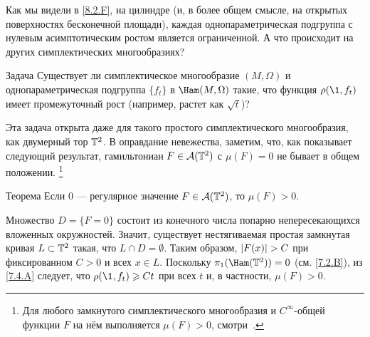 Как мы видели в \ref{8.2.F}, на цилиндре 
(и, в более общем смысле, на открытых поверхностях бесконечной площади),
каждая однопараметрическая подгруппа с нулевым асимптотическим ростом является ограниченной. 
А что происходит на других симплектических многообразиях?

\begin{ex}{Задача}\label{8.4.A}
Существует ли симплектическое многообразие $(M, \Omega)$ и
однопараметрическая подгруппа $\{f_t\}$ в $\Ham (M, \Omega)$ такие,
что функция $\rho (\1, f_t)$ имеет промежуточный рост
(например, растет как $\sqrt{t}$)? 
\end{ex}

Эта задача открыта даже для такого простого симплектического
многообразия, как двумерный тор $\mathbb{T}^2$. 
В оправдание невежества, заметим, что, как показывает следующий
результат, гамильтониан $F \z\in \A (\TT^2)$ с $\mu (F) = 0$ не бывает в общем положении.%
\footnote{
Для любого замкнутого симплектического многообразия и
$C^{\infty}$-общей функции $F$ на нём выполняется $\mu(F)>0$,
смотри~\cite[Section 6.3.1]{PR14}.\dpp}

\begin{thm}{Теорема}\label{8.4.B}
Если 0 — регулярное значение $F \in \mathcal{A} (\mathbb{T}^2)$, то $\mu (F)> 0$.
\end{thm}

Множество $D = \{F = 0\}$ состоит из конечного числа попарно
непересекающихся вложенных окружностей. 
Значит, существует нестягиваемая простая замкнутая кривая $L \z\subset
\TT^2$ такая, что $L\cap D = \emptyset$. 
Таким образом, $|F (x)| \z> C$ при фиксированном $C> 0$ и всех $x \in L$.
Поскольку $\pi_1 (\Ham (\TT^2)) = 0$ (см. \ref{7.2.B}),  из
\ref{7.4.A} следует, что $\rho (\1, f_t) \ge Ct$ при всех $t$ и, в
частности, $\mu (F)> 0$. 
\qeds
